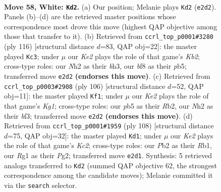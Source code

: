 \documentclass[11pt]{article}
\begin{document}
\begin{figure}[p]\centering
\begin{subfigure}{0.46\textwidth}\centering
\resizebox{\linewidth}{!}{%
\newchessgame
\chessboard[
  setfen={1r3b2/1k4p1/p1p4r/Pp1b1p1p/2p2P1P/2B1P1P1/1P2K2N/1R4R1 w - - 17 58},
  showmover=false,
  pgfstyle=straightmove, color=movearrow, markmove={e2-d2}
]}
\caption{}
\end{subfigure}\hfill
\begin{subfigure}{0.46\textwidth}\centering
\resizebox{\linewidth}{!}{%
\newchessgame
\chessboard[
  setfen={r3r3/4kp2/p3p1p1/PpNpB1Pp/1P5P/3PRP1b/1KP5/8 w - - 37 59},
  showmover=false,
  pgfstyle=straightmove, color=movearrow, markmove={b2-c3}
]}
\caption{}
\end{subfigure}
\\[4pt]
\begin{subfigure}{0.46\textwidth}\centering
\resizebox{\linewidth}{!}{%
\newchessgame
\chessboard[
  setfen={r7/5p2/1p1rk3/1B1p3p/P1pPp2P/4PbP1/PR3P2/1R4K1 w - - 19 54},
  showmover=false,
  pgfstyle=straightmove, color=movearrow, markmove={g1-f1}
]}
\caption{}
\end{subfigure}\hfill
\begin{subfigure}{0.46\textwidth}\centering
\resizebox{\linewidth}{!}{%
\newchessgame
\chessboard[
  setfen={6r1/4kp2/r2p1p2/p1p1pPb1/P1P1P2p/1P1R3P/2K3P1/1R2B3 w - - 46 55},
  showmover=false,
  pgfstyle=straightmove, color=movearrow, markmove={c2-d1}
]}
\caption{}
\end{subfigure}
\caption{\textbf{Move 58, White: \texttt{Kd2}.} (a) Our position; Melanie plays \texttt{Kd2} (\texttt{e2d2}). Panels (b)--(d) are the retrieved master positions whose correspondence most drove this move (highest QAP objective among those that transfer to it). (b) Retrieved from \texttt{ccrl\_top\_p0001\#3280} (ply 116) [structural distance $d$=83, QAP obj=22]: the master played \texttt{Kc3}; under $\mu$ our \emph{Ke2} plays the role of that game's \emph{Kb2}; cross-type roles: our \emph{N}h2 as their \emph{b}h3, our \emph{b}f8 as their \emph{p}b5; transferred move \texttt{e2d2} \textbf{(endorses this move)}. (c) Retrieved from \texttt{ccrl\_top\_p0003\#2908} (ply 106) [structural distance $d$=52, QAP obj=11]: the master played \texttt{Kf1}; under $\mu$ our \emph{Ke2} plays the role of that game's \emph{Kg1}; cross-type roles: our \emph{p}b5 as their \emph{R}b2, our \emph{N}h2 as their \emph{b}f3; transferred move \texttt{e2d2} \textbf{(endorses this move)}. (d) Retrieved from \texttt{ccrl\_top\_p0001\#1959} (ply 108) [structural distance $d$=75, QAP obj=32]: the master played \texttt{Kd1}; under $\mu$ our \emph{Ke2} plays the role of that game's \emph{Kc2}; cross-type roles: our \emph{P}b2 as their \emph{R}b1, our \emph{R}g1 as their \emph{P}g2; transferred move \texttt{e2d1}. Synthesis: 5 retrieved analogs transferred to \texttt{Kd2} (summed QAP objective 62, the strongest correspondence among the candidate moves); Melanie committed it via the \texttt{search} selector.}
\label{fig:thought-m114}
\end{figure}
\end{document}
